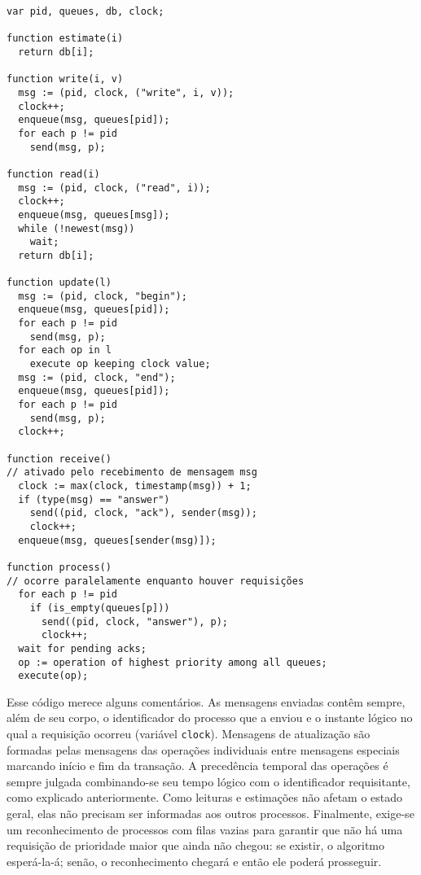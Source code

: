 \begin{lstlisting}[caption={Algoritmo de Herman e Verjus para manter a
 consistência de cópias de uma base de dados em um sistema distribuído.}]
var pid, queues, db, clock;

function estimate(i)
  return db[i];

function write(i, v)
  msg := (pid, clock, ("write", i, v));
  clock++;
  enqueue(msg, queues[pid]);
  for each p != pid
    send(msg, p);

function read(i)
  msg := (pid, clock, ("read", i));
  clock++;
  enqueue(msg, queues[msg]);
  while (!newest(msg))
    wait;
  return db[i];

function update(l)
  msg := (pid, clock, "begin");
  enqueue(msg, queues[pid]);
  for each p != pid
    send(msg, p);
  for each op in l
    execute op keeping clock value;
  msg := (pid, clock, "end");
  enqueue(msg, queues[pid]);
  for each p != pid
    send(msg, p);
  clock++;

function receive()
// ativado pelo recebimento de mensagem msg
  clock := max(clock, timestamp(msg)) + 1;
  if (type(msg) == "answer")
    send((pid, clock, "ack"), sender(msg));
    clock++;
  enqueue(msg, queues[sender(msg)]);

function process()
// ocorre paralelamente enquanto houver requisições
  for each p != pid
    if (is_empty(queues[p]))
      send((pid, clock, "answer"), p);
      clock++;
  wait for pending acks;
  op := operation of highest priority among all queues;
  execute(op);
\end{lstlisting}

Esse código merece alguns comentários. As mensagens enviadas contêm
sempre, além de seu corpo, o identificador do processo que a
enviou e o instante lógico no qual a requisição ocorreu (variável
\texttt{clock}). Mensagens de atualização são formadas pelas mensagens
das operações individuais entre mensagens especiais marcando início e
fim da transação. A precedência temporal das operações é sempre
julgada combinando-se seu tempo lógico com o identificador
requisitante, como explicado anteriormente. Como leituras e estimações
não afetam o estado geral, elas não precisam ser informadas aos outros
processos. Finalmente, exige-se um reconhecimento de processos com
filas vazias para garantir que não há uma requisição de prioridade
maior que ainda não chegou: se existir, o algoritmo esperá-la-á;
senão, o reconhecimento chegará e então ele poderá prosseguir.
